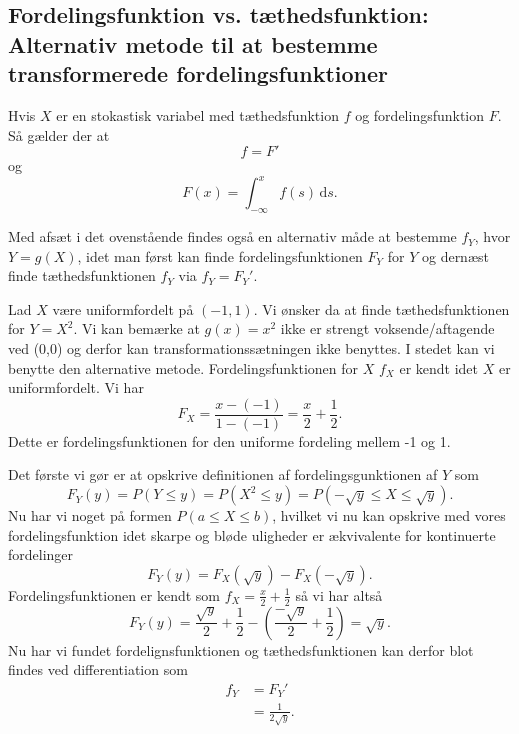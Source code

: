 \subsection{Fordelingsfunktion vs. tæthedsfunktion: Alternativ metode til at bestemme transformerede fordelingsfunktioner}
Hvis $X$ er en stokastisk variabel med tæthedsfunktion $f$ og fordelingsfunktion $F$. Så gælder der at
\[ 
 f = F'
\]
og
\[ 
  F(x) = \int_{-\infty}^{x} f(s) \, \mathrm{d}s
.\]

Med afsæt i det ovenstående findes også en alternativ måde at bestemme $f_Y$, hvor $Y = g(X)$, idet man først kan finde fordelingsfunktionen $F_Y$ for $Y$ og dernæst finde tæthedsfunktionen $f_Y$ via $f_Y = F_Y'$.

\begin{eks} 
  Lad $X$ være uniformfordelt på $(-1, 1)$. Vi ønsker da at finde tæthedsfunktionen for $Y = X^2$.
  \bigbreak
  Vi kan bemærke at $g(x) = x^2$ ikke er strengt voksende/aftagende ved (0,0) og derfor kan transformationssætningen ikke benyttes. I stedet kan vi benytte den alternative metode. Fordelingsfunktionen for $X$ $f_X$ er kendt idet $X$ er uniformfordelt. Vi har
  \[ 
  F_X = \frac{x - (-1)}{1 - (-1)} = \frac{x}{2} + \frac{1}{2}
  .\]
  Dette er fordelingsfunktionen for den uniforme fordeling mellem -1 og 1.

  Det første vi gør er at opskrive definitionen af fordelingsgunktionen af $Y$ som
  \[ 
  F_Y(y) = P(Y \leq y) = P \left( X^2 \leq y \right) = P \left( -\sqrt{y} \leq X \leq \sqrt{y} \right)
  .\]
  Nu har vi noget på formen $P(a \leq X \leq b)$, hvilket vi nu kan opskrive med vores fordelingsfunktion idet skarpe og bløde uligheder er ækvivalente for kontinuerte fordelinger
  \[ 
   F_Y(y) = F_X(\sqrt{y}) - F_X(-\sqrt{y})
  .\]
  Fordelingsfunktionen er kendt som $f_X = \frac{x}{2} + \frac{1}{2}$ så vi har altså
  \[ 
  F_Y(y) = \frac{\sqrt{y}}{2} + \frac{1}{2} - \left( \frac{-\sqrt{y}}{2} + \frac{1}{2} \right) = \sqrt{y}
  .\]
  Nu har vi fundet fordelignsfunktionen og tæthedsfunktionen kan derfor blot findes ved differentiation som
  \begin{align*}
  f_Y &= F_Y' \\
    &= \frac{1}{2 \sqrt{y}}
  .\end{align*}
\end{eks}
